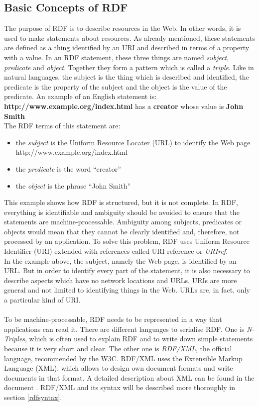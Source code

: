 \documentclass[11pt,a4paper,headsepline, bibtotoc]{scrreprt}
\begin{document}
\subsection{Basic Concepts of RDF}
The purpose of RDF is to describe resources in the Web. In other words, it is used to make statements about resources. As already mentioned, these statements are defined as a thing identified by an URI and described in terms of a property with a value. In an RDF statement, these three things are named \textit{subject}, \textit{predicate} and \textit{object}. Together they form a pattern which is called a {\it triple}. Like in natural languages, the subject is the thing which is described and identified, the predicate is the property of the subject and the object is the value of the predicate. An example of an English statement is:
\\[1ex]
{\bf http://www.example.org/index.html} has a {\bf creator} whose value is {\bf John Smith}
\\[1ex]
The RDF terms of this statement are:
\begin{itemize}
  \item the {\it subject} is the Uniform Resource Locater (URL) to identify the Web page http://www.example.org/index.html
  \item the {\it predicate} is the word ``creator''
  \item the {\it object} is the phrase ``John Smith''
\end{itemize}
This example shows how RDF is structured, but it is not complete. In RDF, everything is identifiable and ambiguity should be avoided to ensure that the statements are machine-processable. Ambiguity among subjects, predicates or objects would mean that they cannot be clearly identified and, therefore, not processed by an application. To solve this problem, RDF uses Uniform Resource Identifier (URI) \cite{URIS} extended with references called URI reference or {\it URIref}.\\
In the example above, the subject, namely the Web page, is identified by an URL. But in order to identify every part of the statement, it is also necessary to describe aspects which have no network locations and URLs. URIs are more general and not limited to identifying things in the Web. URLs are, in fact, only a particular kind of URI.\\
\\
To be machine-processable, RDF needs to be represented in a way that applications can read it. There are different languages to serialise RDF. One is {\it N-Triples}, which is often used to explain RDF and to write down simple statements because it is very short and clear. The other one is {\it RDF/XML}, the official language, recommended by the W3C. RDF/XML uses the Extensible Markup Language (XML), which allows to design own document formats and write documents in that format. A detailed description about XML can be found in the document \cite{XML}. RDF/XML and its syntax will be described more thoroughly in section \ref{rdfsyntax}.
\end{document}

